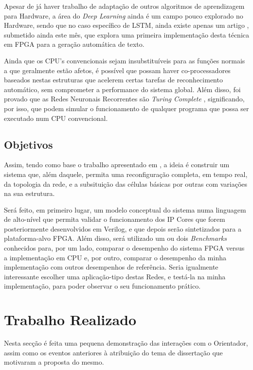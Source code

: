 \documentclass[a4paper, onecolumn, 10pt]{article}
\begin{document}
	Apesar de já haver trabalho de adaptação de outros algoritmos de aprendizagem para Hardware, a área do \textit{Deep Learning} ainda é um campo pouco explorado no Hardware, sendo que no caso específico de LSTM, ainda existe apenas um artigo \autocite{fpgalstm}, submetido ainda este mês, que explora uma primeira implementação desta técnica em FPGA para a geração automática de texto. 
	
	Ainda que os CPU's convencionais sejam insubstituíveis para as funções normais a que geralmente estão afetos, é possível que possam haver co-processadores baseados nestas estruturas que acelerem certas tarefas de reconhecimento automático, sem comprometer a performance do sistema global. Além disso, foi provado  que as Redes Neuronais Recorrentes são \textit{Turing Complete} \autocite{turingcompletenessRNN}\autocite{turingcompletenessRNN2}, significando, por isso, que podem simular o funcionamento de qualquer programa que possa ser executado num CPU convencional.

	\subsection{Objetivos}
	Assim, tendo como base o trabalho apresentado em \autocite{fpgalstm}, a ideia é construir um sistema que, além daquele, permita uma reconfiguração completa, em tempo real, da topologia da rede, e a subsituição das células básicas por outras com variações na sua estrutura.
	
	Será feito, em primeiro lugar, um modelo conceptual do sistema numa linguagem de alto-nível que permita validar o funcionamento dos IP Cores que forem posteriormente desenvolvidos em Verilog, e que depois serão sintetizados para a plataforma-alvo FPGA. Além disso, será utilizado um ou dois \textit{Benchmarks} conhecidos para, por um lado, comparar o desempenho do sistema FPGA versus a implementação em CPU e, por outro, comparar o desempenho da minha implementação com outros desempenhos de referência. Seria igualmente interessante escolher uma aplicação-tipo destas Redes, e testá-la na minha implementação, para poder observar o seu funcionamento prático.
	

\section{Trabalho Realizado}
Nesta secção é feita uma pequena demonstração das interações com o Orientador, assim como os eventos anteriores à atribuição do tema de dissertação que motivaram a proposta do mesmo.
\end{document}
